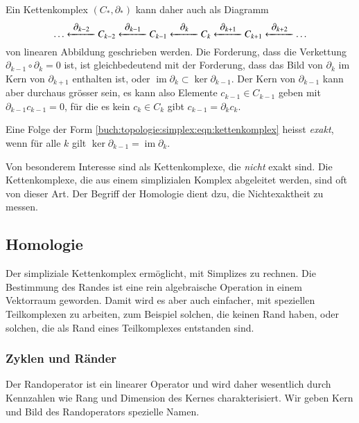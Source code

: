 Ein Kettenkomplex $(C_*,\partial_*)$ kann daher auch als Diagramm
\begin{equation}
\dots
\xleftarrow{\;\quad\clap{$\partial_{k-2}$}\quad\;}
C_{k-2}
\xleftarrow{\;\quad\clap{$\partial_{k-1}$}\quad\;}
C_{k-1}
\xleftarrow{\;\quad\clap{$\partial_{k}$}\quad\;}
C_k
\xleftarrow{\;\quad\clap{$\partial_{k+1}$}\quad\;}
C_{k+1}
\xleftarrow{\;\quad\clap{$\partial_{k+2}$}\quad\;}
\dots
\label{buch:topologie:simplex:eqn:kettenkomplex}
\end{equation}
von linearen Abbildung geschrieben werden.
Die Forderung, dass die Verkettung $\partial_{k-1}\circ\partial_k=0$
ist, ist gleichbedeutend mit der Forderung, dass das Bild von $\partial_k$
im Kern von $\partial_{k+1}$ enthalten ist, oder
$\operatorname{im}\partial_k \subset \ker\partial_{k-1}$.
Der Kern von $\partial_{k-1}$ kann aber durchaus grösser sein, es kann
also Elemente $c_{k-1}\in C_{k-1}$ geben mit $\partial_{k-1} c_{k-1}=0$,
für die es kein $c_k\in C_k$ gibt $c_{k-1}=\partial_kc_k$.

\begin{definition}
Eine Folge der Form
\eqref{buch:topologie:simplex:eqn:kettenkomplex}
heisst \emph{exakt}, wenn für alle $k$ gilt
$\ker\partial_{k-1} = \operatorname{im}\partial_k$.
\end{definition}

Von besonderem Interesse sind als Kettenkomplexe, die \emph{nicht}
exakt sind.
Die Kettenkomplexe, die aus einem simplizialen Komplex abgeleitet
werden, sind oft von dieser Art.
Der Begriff der Homologie dient dzu, die Nichtexaktheit zu messen.

%
%
\subsection{Homologie
\label{buch:topologie:simplex:subsection:homologie}}
Der simpliziale Kettenkomplex ermöglicht, mit Simplizes zu rechnen.
Die Bestimmung des Randes ist eine rein algebraische Operation
in einem Vektorraum geworden.
Damit wird es aber auch einfacher, mit speziellen Teilkomplexen
zu arbeiten, zum Beispiel solchen, die keinen Rand haben, oder solchen,
die als Rand eines Teilkomplexes entstanden sind.

%
%
\subsubsection{Zyklen und Ränder}
Der Randoperator ist ein linearer Operator und wird daher wesentlich
durch Kennzahlen wie Rang und Dimension des Kernes charakterisiert.
Wir geben Kern und Bild des Randoperators spezielle Namen.

